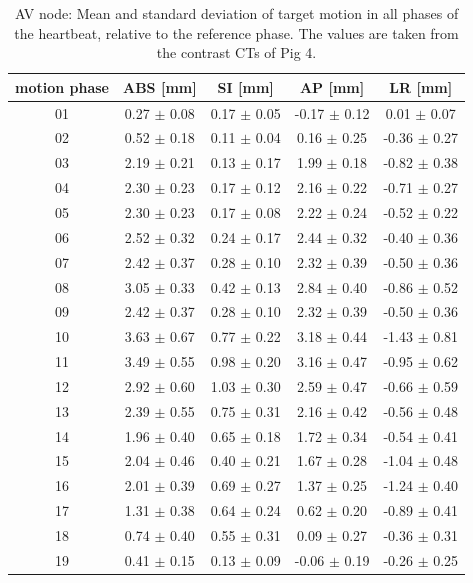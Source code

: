 \documentclass[type=dr, dr=rernat, accentcolor=tud7b,colorbacktitle, bigchapter, openright, twoside, 12pt ]{tudthesis}
\begin{document}
\begin{table}[H]
  \centering
  \scriptsize
  \caption{AV node: Mean and standard deviation of target motion in all phases of the heartbeat, relative to the reference phase. The values are 
  taken from the contrast CTs of Pig 4.}
  \begin{tabular}{|c|c|c|c|c|}
    \hline\hline
    motion phase\rule{0pt}{2.6ex}\rule[-1.2ex]{0pt}{0pt} & ABS [mm] & SI [mm] & AP [mm] & LR [mm]\\
    \hline
01 &0.27 $\pm$ 0.08 &0.17 $\pm$ 0.05 &-0.17 $\pm$ 0.12 &0.01 $\pm$ 0.07 \\
02 &0.52 $\pm$ 0.18 &0.11 $\pm$ 0.04 &0.16 $\pm$ 0.25 &-0.36 $\pm$ 0.27 \\
03 &2.19 $\pm$ 0.21 &0.13 $\pm$ 0.17 &1.99 $\pm$ 0.18 &-0.82 $\pm$ 0.38 \\
04 &2.30 $\pm$ 0.23 &0.17 $\pm$ 0.12 &2.16 $\pm$ 0.22 &-0.71 $\pm$ 0.27 \\
05 &2.30 $\pm$ 0.23 &0.17 $\pm$ 0.08 &2.22 $\pm$ 0.24 &-0.52 $\pm$ 0.22 \\
06 &2.52 $\pm$ 0.32 &0.24 $\pm$ 0.17 &2.44 $\pm$ 0.32 &-0.40 $\pm$ 0.36 \\
07 &2.42 $\pm$ 0.37 &0.28 $\pm$ 0.10 &2.32 $\pm$ 0.39 &-0.50 $\pm$ 0.36 \\
08 &3.05 $\pm$ 0.33 &0.42 $\pm$ 0.13 &2.84 $\pm$ 0.40 &-0.86 $\pm$ 0.52 \\
09 &2.42 $\pm$ 0.37 &0.28 $\pm$ 0.10 &2.32 $\pm$ 0.39 &-0.50 $\pm$ 0.36 \\
10 &3.63 $\pm$ 0.67 &0.77 $\pm$ 0.22 &3.18 $\pm$ 0.44 &-1.43 $\pm$ 0.81 \\
11 &3.49 $\pm$ 0.55 &0.98 $\pm$ 0.20 &3.16 $\pm$ 0.47 &-0.95 $\pm$ 0.62 \\
12 &2.92 $\pm$ 0.60 &1.03 $\pm$ 0.30 &2.59 $\pm$ 0.47 &-0.66 $\pm$ 0.59 \\
13 &2.39 $\pm$ 0.55 &0.75 $\pm$ 0.31 &2.16 $\pm$ 0.42 &-0.56 $\pm$ 0.48 \\
14 &1.96 $\pm$ 0.40 &0.65 $\pm$ 0.18 &1.72 $\pm$ 0.34 &-0.54 $\pm$ 0.41 \\
15 &2.04 $\pm$ 0.46 &0.40 $\pm$ 0.21 &1.67 $\pm$ 0.28 &-1.04 $\pm$ 0.48 \\
16 &2.01 $\pm$ 0.39 &0.69 $\pm$ 0.27 &1.37 $\pm$ 0.25 &-1.24 $\pm$ 0.40 \\
17 &1.31 $\pm$ 0.38 &0.64 $\pm$ 0.24 &0.62 $\pm$ 0.20 &-0.89 $\pm$ 0.41 \\
18 &0.74 $\pm$ 0.40 &0.55 $\pm$ 0.31 &0.09 $\pm$ 0.27 &-0.36 $\pm$ 0.31 \\
19 &0.41 $\pm$ 0.15 &0.13 $\pm$ 0.09 &-0.06 $\pm$ 0.19 &-0.26 $\pm$ 0.25 \\
    \hline\hline
  \end{tabular}
  \label{tab:motion:AV:Pig4}
\end{table}
\end{document}
